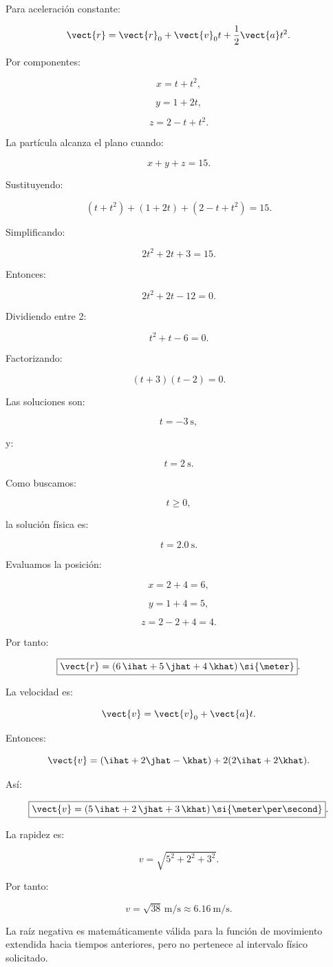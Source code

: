 \begin{explicacion}
Para aceleración constante:

\[
\vect{r}
=
\vect{r}_0
+
\vect{v}_0t
+
\frac{1}{2}\vect{a}t^2.
\]

Por componentes:

\[
x=t+t^2,
\]

\[
y=1+2t,
\]

\[
z=2-t+t^2.
\]

La partícula alcanza el plano cuando:

\[
x+y+z=15.
\]

Sustituyendo:

\[
(t+t^2)+(1+2t)+(2-t+t^2)=15.
\]

Simplificando:

\[
2t^2+2t+3=15.
\]

Entonces:

\[
2t^2+2t-12=0.
\]

Dividiendo entre 2:

\[
t^2+t-6=0.
\]

Factorizando:

\[
(t+3)(t-2)=0.
\]

Las soluciones son:

\[
t=-\SI{3}{\second},
\]

y:

\[
t=\SI{2}{\second}.
\]

Como buscamos:

\[
t\geq0,
\]

la solución física es:

\[
\boxed{t=\SI{2.0}{\second}}.
\]

Evaluamos la posición:

\[
x=2+4=6,
\]

\[
y=1+4=5,
\]

\[
z=2-2+4=4.
\]

Por tanto:

\[
\boxed{
\vect{r}
=
(6\,\ihat+5\,\jhat+4\,\khat)\,\si{\meter}
}.
\]

La velocidad es:

\[
\vect{v}
=
\vect{v}_0+\vect{a}t.
\]

Entonces:

\[
\vect{v}
=
(\ihat+2\jhat-\khat)
+
2(2\ihat+2\khat).
\]

Así:

\[
\boxed{
\vect{v}
=
(5\,\ihat+2\,\jhat+3\,\khat)\,
\si{\meter\per\second}
}.
\]

La rapidez es:

\[
v
=
\sqrt{5^2+2^2+3^2}.
\]

Por tanto:

\[
\boxed{
v
=
\sqrt{38}\,\si{\meter\per\second}
\approx
\SI{6.16}{\meter\per\second}
}.
\]

La raíz negativa es matemáticamente válida para la función de movimiento extendida hacia tiempos anteriores, pero no pertenece al intervalo físico solicitado.
\end{explicacion}



